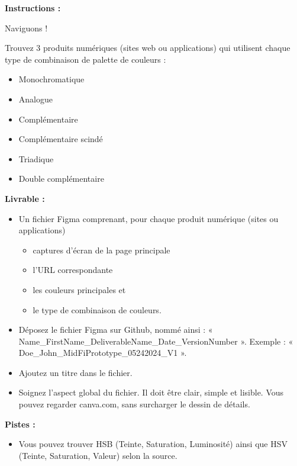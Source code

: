 \makeheaderfiles

\textbf{Instructions :}

Naviguons !

Trouvez 3 produits numériques (sites web ou applications) qui utilisent chaque type de combinaison de palette de couleurs :

\begin{itemize}
\item Monochromatique
\item Analogue
\item Complémentaire
\item Complémentaire scindé
\item Triadique
\item Double complémentaire
\end{itemize}

\textbf{Livrable :}

\begin{itemize}
\item Un fichier Figma comprenant, pour chaque produit numérique (sites ou applications)
\begin{itemize}
\item captures d'écran de la page principale
\item l'URL correspondante
\item les couleurs principales et
\item le type de combinaison de couleurs.
\end{itemize}
\item Déposez le fichier Figma sur Github, nommé ainsi : « Name\_FirstName\_DeliverableName\_Date\_VersionNumber ». Exemple : « Doe\_John\_MidFiPrototype\_05242024\_V1 ».
\item Ajoutez un titre dans le fichier.
\item Soignez l'aspect global du fichier. Il doit être clair, simple et lisible. Vous pouvez regarder canva.com, sans surcharger le dessin de détails.
\end{itemize}

\textbf{Pistes :}

\begin{itemize}
\item Vous pouvez trouver HSB (Teinte, Saturation, Luminosité) ainsi que HSV (Teinte, Saturation, Valeur) selon la source.
\end{itemize}

